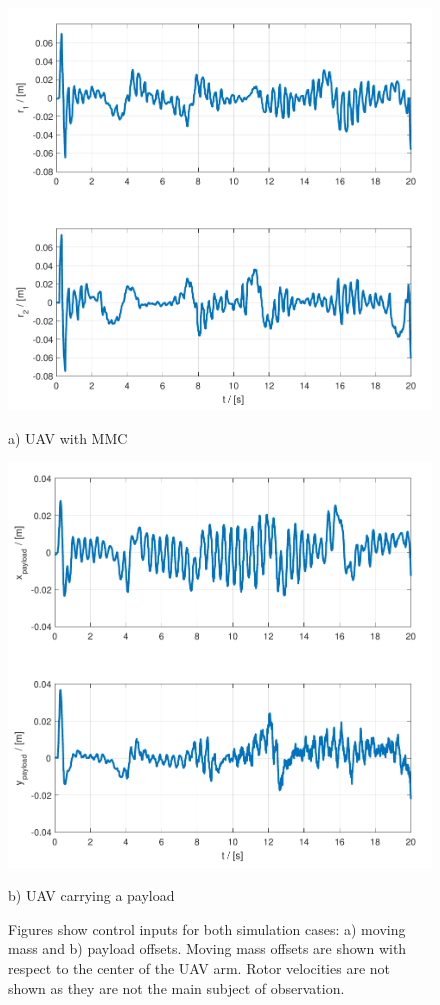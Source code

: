\begin{figure}
	\centering
	\begin{minipage}{0.5\columnwidth}
		\centering
		\includegraphics[width=\columnwidth]{./pictures/traj_mass_off.pdf}
		\caption*{a) UAV with MMC}
		\label{fig:mmcuav_control}
	\end{minipage}%
	\begin{minipage}{0.5\columnwidth}
		\centering
		\includegraphics[width=\columnwidth]{./pictures/traj_payload_off.pdf}
		\caption*{b) UAV carrying a payload}
		\label{fig:mmuav_control}
	\end{minipage}
	\caption{Figures show control inputs for both simulation cases: a) moving mass and b) payload offsets. Moving mass offsets are shown with respect to the center of the UAV arm. Rotor velocities are not shown as they are not the main subject of observation. }
\end{figure}


